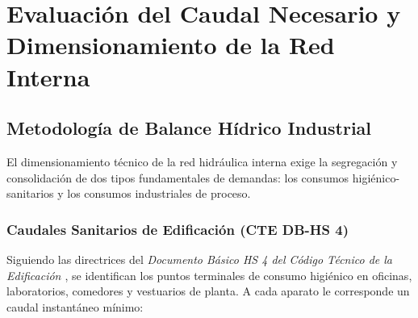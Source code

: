 \documentclass{report}
\begin{document}
\chapter{Evaluación del Caudal Necesario y Dimensionamiento de la Red Interna}



\section{Metodología de Balance Hídrico Industrial}

El dimensionamiento técnico de la red hidráulica interna exige la segregación y consolidación de dos tipos fundamentales de demandas: los consumos higiénico-sanitarios y los consumos industriales de proceso.



\subsection{Caudales Sanitarios de Edificación (CTE DB-HS 4)}

Siguiendo las directrices del \textit{Documento Básico HS 4 del Código Técnico de la Edificación \cite{CTE_DB_HS4}}, se identifican los puntos terminales de consumo higiénico en oficinas, laboratorios, comedores y vestuarios de planta. A cada aparato le corresponde un caudal instantáneo mínimo:
\end{document}
